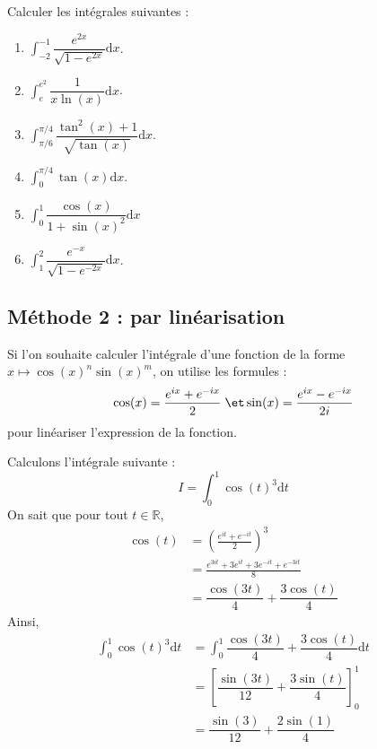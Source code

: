 \documentclass[french,11pt,twoside]{VcCours}
\newcommand{\dx}{\text{d}x}
\newcommand{\dt}{\text{d}t}
\begin{document}
\begin{ApplicationDirecte}{} Calculer les intégrales suivantes :

\begin{multicols}{2}
\begin{enumerate}
\item $\int_{-2}^{-1} \dfrac{e^{2x}}{\sqrt{1-e^{2x}}} \dx$.
\item $\int_{e}^{e^2} \dfrac{1}{x\ln(x)} \dx$.
\item $\int_{\pi/6}^{\pi/4} \dfrac{\tan^2(x)+1}{\sqrt{\tan(x)}} \dx$.
\columnbreak
\item $\int_{0}^{\pi/4} \tan(x) \dx$.
\item $\int_{0}^1 \dfrac{\cos(x)}{1+\sin(x)^2} \dx$
\item $ \int_{1}^{2} \dfrac{e^{-x}}{\sqrt{1-e^{-2x}}} \dx$.
\end{enumerate}
\end{multicols}
\medskip
\end{ApplicationDirecte}

\subsection{Méthode 2 : par linéarisation}
Si l'on souhaite calculer l'intégrale d'une fonction de la forme $x \mapsto \cos(x)^n \sin(x)^m$, on utilise les formules :
$$ \cos(x) = \frac{e^{ix}+e^{-ix}}{2} \; \et \sin(x) =\frac{e^{ix}-e^{-ix}}{2i}$$
pour linéariser l'expression de la fonction.

\medskip

\begin{Exemple} Calculons l'intégrale suivante :
$$ I = \int_{0}^{1} \cos(t)^3 \dt$$
On sait que pour tout $t \in \mathbb{R}$,
\begin{align*}
\cos(t) & = \left( \frac{e^{it}+e^{-it}}{2} \right)^3 \\
& = \frac{e^{3it}+ 3e^{it}+3 e^{-it}+ e^{-3it}}{8} \\
& = \dfrac{\cos(3t)}{4} + \dfrac{3\cos(t)}{4} 
\end{align*}
Ainsi,
\begin{align*}
\int_{0}^{1} \cos(t)^3 \dt & = \int_{0}^{1} \dfrac{\cos(3t)}{4} + \dfrac{3\cos(t)}{4} \dt \\
& = \left[ \dfrac{\sin(3t)}{12} + \dfrac{3\sin(t)}{4} \right]_{0}^1 \\
& = \dfrac{\sin(3)}{12} + \dfrac{2\sin(1)}{4} 
\end{align*}
\end{Exemple}
\end{document}
